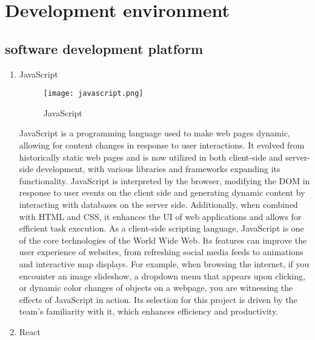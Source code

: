 \documentclass[conference]{IEEEtran}
\begin{document}
\section{Development environment}

\subsection{software development platform}

\begin{enumerate}[itemsep=2ex, parsep=1ex]
	\item JavaScript
	      	              
	      \begin{figure}[h!]
	      	\centering
	      	\texttt{[image: javascript.png]}
	      	\caption{JavaScript}
	      	\label{fig:JavaScript}
	      \end{figure}
	      	      
	      JavaScript is a programming language used to make web pages dynamic, allowing
	      for content changes in response to user interactions. It evolved from
	      historically static web pages and is now utilized in both client-side and
	      server-side development, with various libraries and frameworks expanding its
	      functionality. JavaScript is interpreted by the browser, modifying the DOM
	      in response to user events on the client side and generating dynamic content
	      by interacting with databases on the server side. Additionally, when combined
	      with HTML and CSS, it enhances the UI of web applications and allows for
	      efficient task execution. As a client-side scripting language, JavaScript
	      is one of the core technologies of the World Wide Web. Its features can improve
	      the user experience of websites, from refreshing social media feeds to
	      animations and interactive map displays. For example, when browsing the
	      internet, if you encounter an image slideshow, a dropdown menu that
	      appears upon clicking, or dynamic color changes of objects on a webpage,
	      you are witnessing the effects of JavaScript in action. Its selection for this
	      project is driven by the team's familiarity with it, which enhances
	      efficiency and productivity.
	      
	      \vspace{5cm}
	      	      
	\item React
	      	      

\end{enumerate}
\end{document}
